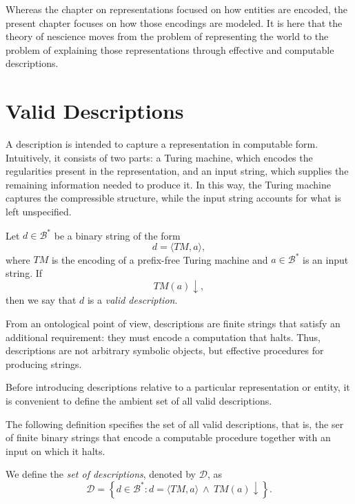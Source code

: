 Whereas the chapter on representations focused on how entities are encoded, the present chapter focuses on how those encodings are modeled. It is here that the theory of nescience moves from the problem of representing the world to the problem of explaining those representations through effective and computable descriptions.

%
%

\section{Valid Descriptions}
\label{sec:descriptions_models}

A description is intended to capture a representation in computable form. Intuitively, it consists of two parts: a Turing machine, which encodes the regularities present in the representation, and an input string, which supplies the remaining information needed to produce it. In this way, the Turing machine captures the compressible structure, while the input string accounts for what is left unspecified.

\begin{definition}
\label{def:description_model}
Let $d \in \mathcal{B}^\ast$ be a binary string of the form
\[
d = \langle TM, a \rangle,
\]
where $TM$ is the encoding of a prefix-free Turing machine and $a \in \mathcal{B}^\ast$ is an input string. If
\[
TM(a)\downarrow,
\]
then we say that $d$ is a \emph{valid description}.
\end{definition}

From an ontological point of view, descriptions are finite strings that satisfy an additional requirement: they must encode a computation that halts. Thus, descriptions are not arbitrary symbolic objects, but effective procedures for producing strings.

Before introducing descriptions relative to a particular representation or entity, it is convenient to define the ambient set of all valid descriptions.

The following definition specifies the set of all valid descriptions, that is, the ser of finite binary strings that encode a computable procedure together with an input on which it halts.

\begin{definition}
\label{def:set_of_descriptions}
We define the \emph{set of descriptions}, denoted by $\mathcal{D}$, as
\[
\mathcal{D} = \left\{ d \in \mathcal{B}^\ast : d = \langle TM,a\rangle \ \wedge\ TM(a)\downarrow \right\}.
\]
\end{definition}

